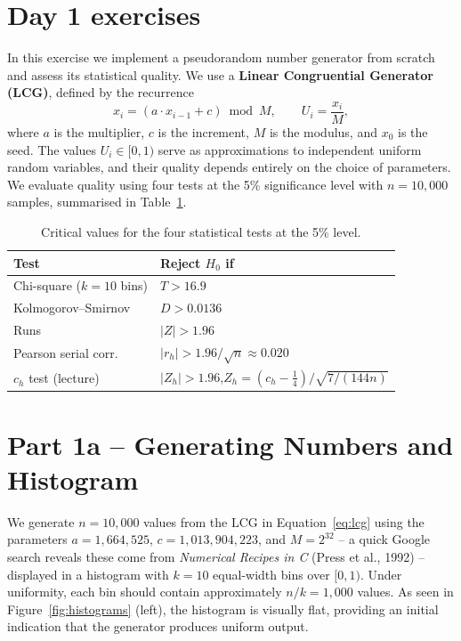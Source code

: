 \newpage
\section*{Day 1 exercises}

In this exercise we implement a pseudorandom number generator
from scratch and assess its statistical quality. We use a
\textbf{Linear Congruential Generator (LCG)}, defined by the recurrence
\begin{equation}
    x_i = (a \cdot x_{i-1} + c) \bmod M, \qquad U_i = \frac{x_i}{M},
    \label{eq:lcg}
\end{equation}
where $a$ is the multiplier, $c$ is the increment, $M$ is the modulus, and
$x_0$ is the seed. The values $U_i \in [0, 1)$ serve as approximations to
independent uniform random variables, and their quality depends entirely on
the choice of parameters. We evaluate quality using four tests at the 5\%
significance level with $n = 10{,}000$ samples, summarised in
Table~\ref{tab:critical}.

\begin{table}[h]
    \centering
    \caption{Critical values for the four statistical tests at the 5\% level.}
    \label{tab:critical}
    \renewcommand{\arraystretch}{1.1}
    \begin{tabular}{ll}
        \toprule
        Test & Reject $H_0$ if \\
        \midrule
        Chi-square ($k = 10$ bins) & $T > 16.9$ \\
        Kolmogorov--Smirnov        & $D > 0.0136$ \\
        Runs                       & $|Z| > 1.96$ \\
        Pearson serial corr.\      & $|r_h| > 1.96/\sqrt{n} \approx 0.020$ \\
        $c_h$ test (lecture)       & $|Z_h| > 1.96$,\quad $Z_h = (c_h - \tfrac{1}{4})\big/\sqrt{7/(144n)}$ \\
        \bottomrule
    \end{tabular}
\end{table}

\section*{Part 1a -- Generating Numbers and Histogram}

We generate $n = 10{,}000$ values from the LCG in Equation~\eqref{eq:lcg}
using the parameters $a = 1{,}664{,}525$, $c = 1{,}013{,}904{,}223$, and
$M = 2^{32}$ -- a quick Google search reveals these come from
\textit{Numerical Recipes in C} (Press et al., 1992) -- displayed in a histogram with $k = 10$ equal-width bins over
$[0, 1)$. Under uniformity, each bin should contain approximately
$n/k = 1{,}000$ values. As seen in Figure~\ref{fig:histograms} (left), the
histogram is visually flat, providing an initial indication that the
generator produces uniform output.


